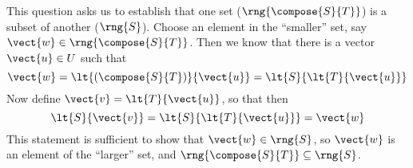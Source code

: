 This question asks us to establish that one set ($\rng{\compose{S}{T}}$) is a subset of another ($\rng{S}$).  Choose an element in the ``smaller'' set, say $\vect{w}\in\rng{\compose{S}{T}}$.  Then we know that there is a vector $\vect{u}\in U$ such that
%
\begin{equation*}
\vect{w}=\lt{\left(\compose{S}{T}\right)}{\vect{u}}=\lt{S}{\lt{T}{\vect{u}}}
\end{equation*}
%
Now define $\vect{v}=\lt{T}{\vect{u}}$, so that then
%
\begin{equation*}
\lt{S}{\vect{v}}=\lt{S}{\lt{T}{\vect{u}}}=\vect{w}
\end{equation*}
%
This statement is sufficient to show that $\vect{w}\in\rng{S}$, so $\vect{w}$ is an element of the ``larger'' set, and $\rng{\compose{S}{T}}\subseteq\rng{S}$.